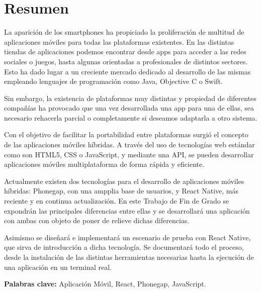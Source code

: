 \chapter*{Resumen}
\justifying
{}
\setcounter{page}{5}

La aparición de los smartphones ha propiciado la proliferación de multitud de aplicaciones móviles para todas las plataformas existentes. En las distintas tiendas de aplicaciones podemos encontrar desde apps para acceder a las redes sociales o juegos, hasta algunas orientadas a profesionales de distintos sectores. Esto ha dado lugar a un creciente mercado dedicado al desarrollo de las mismas empleando lenguajes de programación como Java, Objective C o Swift. 

Sin embargo, la existencia de plataformas muy distintas y propiedad de diferentes compañías ha provocado que una vez desarrollada una app para una de ellas, sea necesario rehacerla parcial o completamente si deseamos adaptarla a otro sistema. 

Con el objetivo de facilitar la portabilidad entre plataformas surgió el concepto de las aplicaciones móviles híbridas. A través del uso de tecnologías web estándar como son HTML5, CSS o JavaScript, y mediante una API, se pueden desarrollar aplicaciones móviles multiplataforma de forma rápida y eficiente. 

Actualmente existen dos tecnologías para el desarrollo de aplicaciones móviles híbridas: Phonegap, con una ampplia base de usuarios, y React Native, más reciente y en continua actualización. En este Trabajo de Fin de Grado se expondrán las principales diferencias entre ellas y se desarrollará una aplicación con ambas con objeto de poner de relieve dichas diferencias. 

Asimismo se diseñará e implementará un escenario de prueba con React Native, que sirva de introducción a dicha tecnología. Se documentará todo el proceso, desde la instalación de las distintas herramientas necesarias hasta la ejecución de una aplicación en un terminal real.

\vspace{5mm}
\large{\textbf{Palabras clave: } Aplicación Móvil, React, Phonegap, JavaScript.}
\afterpage{\blankpage}